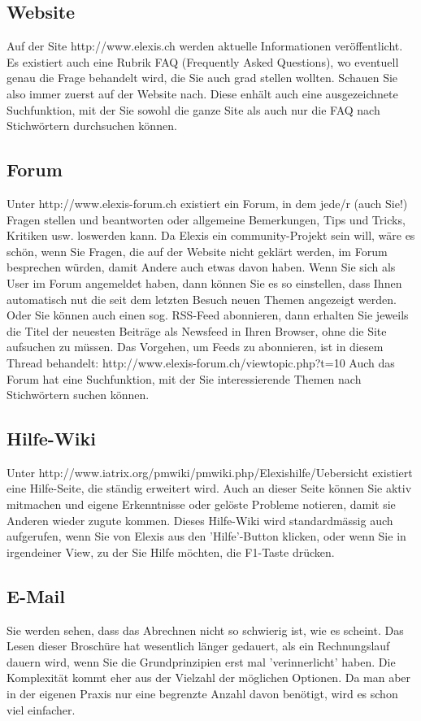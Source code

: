 \documentclass[a4paper]{scrartcl}
\begin{document}
\subsection{Website}
Auf der Site http://www.elexis.ch werden aktuelle Informationen veröffentlicht. Es existiert auch eine Rubrik FAQ (Frequently Asked Questions), wo eventuell genau die Frage behandelt wird, die Sie auch grad stellen wollten. Schauen Sie also immer zuerst auf der Website nach. Diese enhält auch eine ausgezeichnete Suchfunktion, mit der Sie sowohl die ganze Site als auch nur die FAQ nach Stichwörtern durchsuchen können.

\subsection{Forum}
Unter http://www.elexis-forum.ch existiert ein Forum, in dem jede/r (auch Sie!) Fragen stellen und beantworten oder allgemeine Bemerkungen, Tips und Tricks, Kritiken usw. loswerden kann. Da Elexis ein community-Projekt sein will, wäre es schön, wenn Sie Fragen, die auf der Website nicht geklärt werden, im Forum besprechen würden, damit Andere auch etwas davon haben.
Wenn Sie sich als User im Forum angemeldet haben, dann können Sie es so einstellen, dass Ihnen automatisch nut die seit dem letzten Besuch neuen Themen angezeigt werden. Oder Sie können auch einen sog. RSS-Feed abonnieren, dann erhalten Sie jeweils die Titel der neuesten Beiträge als Newsfeed in Ihren Browser, ohne die Site aufsuchen zu müssen. Das Vorgehen, um Feeds zu abonnieren, ist in diesem Thread behandelt: http://www.elexis-forum.ch/viewtopic.php?t=10
Auch das Forum hat eine Suchfunktion, mit der Sie interessierende Themen nach Stichwörtern suchen können.

\subsection{Hilfe-Wiki}
Unter http://www.iatrix.org/pmwiki/pmwiki.php/Elexishilfe/Uebersicht existiert eine Hilfe-Seite, die ständig erweitert wird. Auch an dieser Seite können Sie aktiv mitmachen und eigene Erkenntnisse oder gelöste Probleme notieren, damit sie Anderen wieder zugute kommen.
Dieses Hilfe-Wiki wird standardmässig auch aufgerufen, wenn Sie von Elexis aus den 'Hilfe'-Button klicken, oder wenn Sie in irgendeiner View, zu der Sie Hilfe möchten, die F1-Taste drücken.

\subsection{E-Mail}
Sie werden sehen, dass das Abrechnen nicht so schwierig ist, wie es scheint. Das Lesen dieser Broschüre hat wesentlich länger gedauert, als ein Rechnungslauf dauern wird, wenn Sie die Grundprinzipien erst mal 'verinnerlicht' haben. Die Komplexität kommt eher aus der Vielzahl der möglichen Optionen. Da man aber in der eigenen Praxis nur eine begrenzte Anzahl davon benötigt, wird es schon viel einfacher.
\end{document}
